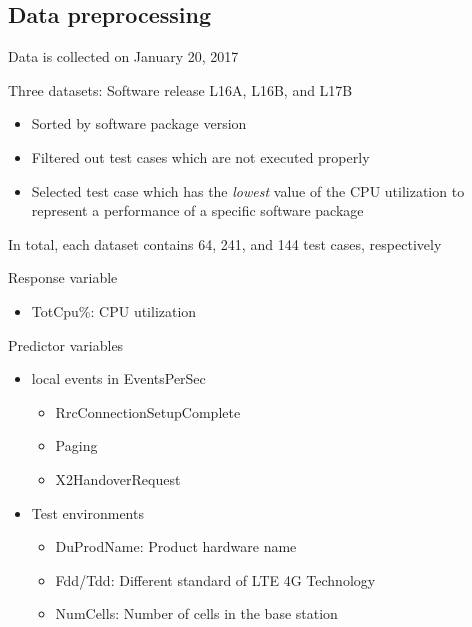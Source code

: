 \documentclass{beamer}
\begin{document}
\subsection{Data preprocessing}
\begin{frame}
Data is collected on January 20, 2017

Three datasets: Software release L16A, L16B, and L17B
\begin{itemize}
	\item Sorted by software package version
	\item Filtered out test cases which are not executed properly
	\item Selected test case which has the \textit{lowest} value of the CPU utilization to represent a performance of a specific software package
\end{itemize}

In total, each dataset contains 64, 241, and 144 test cases, respectively

\end{frame}

%

\begin{frame}
Response variable 
\begin{itemize}
	\item TotCpu\%: CPU utilization
\end{itemize}	
\vspace{1em}
Predictor variables
\begin{itemize}
	\item local events in EventsPerSec
	\begin{itemize}
		\item RrcConnectionSetupComplete
		\item Paging
		\item X2HandoverRequest
	\end{itemize}	
	\item Test environments
	\begin{itemize}
		\item DuProdName: Product hardware name
		\item Fdd/Tdd: Different standard of LTE 4G Technology
		\item NumCells: Number of cells in the base station
	\end{itemize}
\end{itemize}


\end{frame}
\end{document}
